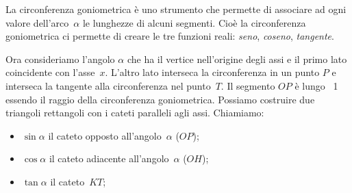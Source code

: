 La circonferenza goniometrica è uno strumento che permette di associare ad 
ogni valore dell'arco~\(\alpha\) le lunghezze di alcuni segmenti. 
Cioè la circonferenza goniometrica ci permette di creare le tre funzioni 
reali: \emph{seno}, \emph{coseno}, \emph{tangente}. 

\noindent\begin{minipage}{.54\textwidth}
Ora consideriamo l'angolo \(\alpha\) che ha il vertice nell'origine degli 
assi e il primo lato coincidente con l'asse~\(x\). L'altro lato interseca la 
circonferenza in un punto \(P\) e interseca la tangente alla circonferenza 
nel punto~\(T\).
Il segmento \(OP\) è lungo ~1 essendo il raggio della circonferenza 
goniometrica.
Possiamo costruire due triangoli rettangoli con i cateti paralleli agli assi. 
Chiamiamo:
\begin{itemize} [nosep]
 \item \(\sin \alpha\) il cateto opposto all'angolo~\(\alpha\) (\(OP\));
 \item \(\cos \alpha\) il cateto adiacente all'angolo~\(\alpha\) (\(OH\));
 \item \(\tan \alpha\) il cateto~\(KT\);
\end{itemize}
\end{minipage}
\begin{minipage}{.44\textwidth}
  \begin{center}
\begin{inaccessibleblock}
    
\end{inaccessibleblock}
  \end{center}
\end{minipage}



